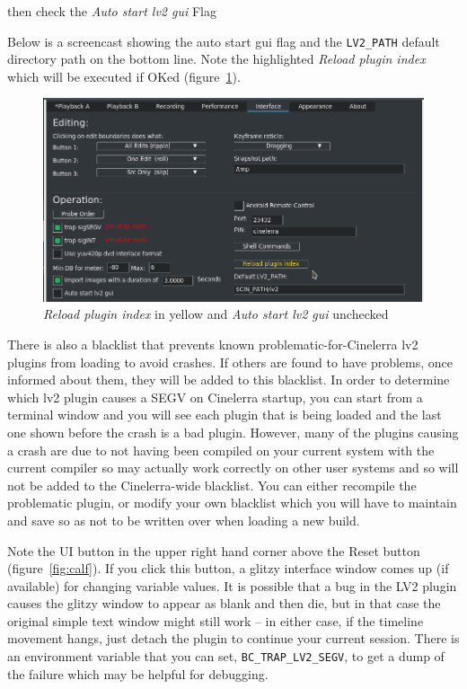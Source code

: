 then check the \textit{Auto start lv2 gui} Flag

Below is a screencast showing the auto start gui flag and the \texttt{LV2\_PATH} default directory path on the bottom line. Note the highlighted \textit{Reload plugin index} which will be executed if OKed (figure~\ref{fig:reload}).

\begin{figure}[htpb]
    \centering
    \includegraphics[width=0.8\linewidth]{images/reload.png}
    \caption{\textit{Reload plugin index} in yellow and \textit{Auto start lv2 gui} unchecked}
    \label{fig:reload}
\end{figure}

There is also a blacklist that prevents known problematic-for-Cinelerra lv2 plugins from loading to avoid crashes. If others are found to have problems, once informed about them, they will be added to this blacklist. In order to determine which lv2 plugin causes a SEGV on Cinelerra startup, you can start from a terminal window and you will see each plugin that is being loaded and the last one shown before the crash is a bad plugin. However, many of the plugins causing a crash are due to not having been compiled on your current system with the current compiler so may actually work correctly on other user systems and so will not be added to the Cinelerra-wide blacklist. You can either recompile the problematic plugin, or modify your own blacklist which you will have to maintain and save so as not to be written over when loading a new build.

Note the UI button in the upper right hand corner above the Reset button (figure~\ref{fig:calf}). If you click this button, a glitzy interface window comes up (if available) for changing variable values. It is possible that a bug in the LV2 plugin causes the glitzy window to appear as blank and then die, but in that case the original simple text window might still work -- in either case, if the timeline movement hangs, just detach the plugin to continue your current session. There is an environment variable that you can set,  \texttt{BC\_TRAP\_LV2\_SEGV}, to get a dump of the failure which may be helpful for debugging.

